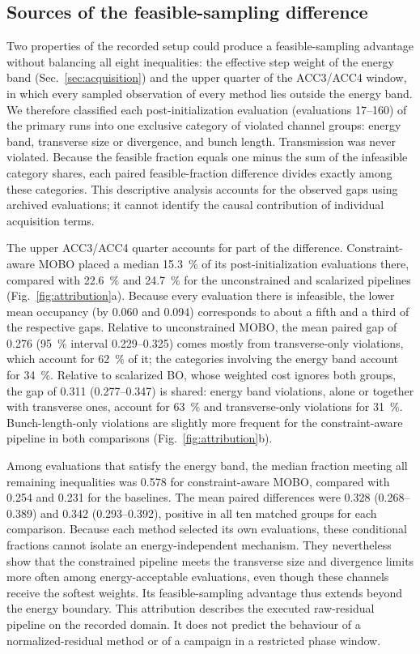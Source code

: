 \documentclass[aps,prab,reprint,superscriptaddress,amsmath,amssymb,floatfix]{revtex4-2}
\begin{document}
\subsection{Sources of the feasible-sampling difference}
\label{sec:attribution}
Two properties of the recorded setup could produce a feasible-sampling advantage without
balancing all eight inequalities: the effective step weight of the energy band
(Sec.~\ref{sec:acquisition}) and the upper quarter of the ACC3/ACC4 window, in which
every sampled observation of every method lies outside the energy band. We therefore
classified each post-initialization evaluation (evaluations 17--160) of the primary runs into
one exclusive category of violated channel groups: energy band, transverse size or
divergence, and bunch length. Transmission was never violated. Because the feasible fraction
equals one minus the sum of the infeasible category shares, each paired feasible-fraction
difference divides exactly among these categories. This descriptive analysis accounts for the
observed gaps using archived evaluations; it cannot
identify the causal contribution of individual acquisition terms.

The upper ACC3/ACC4 quarter accounts for part of the difference. Constraint-aware MOBO placed a
median \SI{15.3}{\percent} of its post-initialization evaluations there, compared with
\SI{22.6}{\percent} and \SI{24.7}{\percent} for the unconstrained and scalarized pipelines
(Fig.~\ref{fig:attribution}a). Because every evaluation there is infeasible, the lower mean
occupancy (by 0.060 and 0.094) corresponds to about a fifth and a third of the respective gaps.
Relative to unconstrained MOBO, the mean paired gap of 0.276 (\SI{95}{\percent} interval
0.229--0.325) comes mostly from transverse-only violations, which account for \SI{62}{\percent}
of it; the categories involving the energy band account for \SI{34}{\percent}. Relative to
scalarized BO, whose weighted cost ignores both groups, the gap of 0.311 (0.277--0.347) is
shared: energy band violations, alone or together with transverse ones, account for
\SI{63}{\percent} and transverse-only violations for \SI{31}{\percent}. Bunch-length-only
violations are slightly more frequent for the constraint-aware pipeline in both comparisons
(Fig.~\ref{fig:attribution}b).

Among evaluations that satisfy the energy band, the median fraction meeting all remaining
inequalities was 0.578 for constraint-aware MOBO, compared with 0.254 and 0.231 for the
baselines. The mean paired differences were 0.328 (0.268--0.389) and 0.342 (0.293--0.392),
positive in all ten matched groups for each comparison. Because each method selected its own
evaluations, these conditional fractions cannot isolate an energy-independent mechanism. They
nevertheless show that the constrained pipeline meets the transverse size and divergence limits
more often among energy-acceptable evaluations, even though these channels receive the softest
weights. Its feasible-sampling advantage thus extends beyond the energy boundary. This
attribution describes the executed raw-residual pipeline on the recorded domain. It does not
predict the behaviour of a normalized-residual method or of a campaign in a restricted phase
window.
\end{document}

